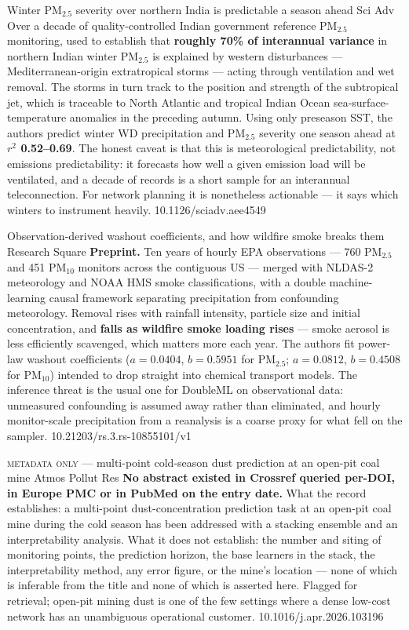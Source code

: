 \documentclass[10pt]{article}
\begin{document}
{Winter PM$_{2.5}$ severity over northern India is predictable a season ahead}
{Sci Adv}
{Over a decade of quality-controlled Indian government reference PM$_{2.5}$ monitoring,
used to establish that \textbf{roughly 70\% of interannual variance} in northern Indian
winter PM$_{2.5}$ is explained by western disturbances --- Mediterranean-origin
extratropical storms --- acting through ventilation and wet removal. The storms in turn
track to the position and strength of the subtropical jet, which is traceable to North
Atlantic and tropical Indian Ocean sea-surface-temperature anomalies in the preceding
autumn. Using only preseason SST, the authors predict winter WD precipitation and PM$_{2.5}$
severity one season ahead at \textbf{$r^2$ 0.52--0.69}. The honest caveat is that this is
meteorological predictability, not emissions predictability: it forecasts how well a given
emission load will be ventilated, and a decade of records is a short sample for an
interannual teleconnection. For network planning it is nonetheless actionable --- it says
which winters to instrument heavily.}
{10.1126/sciadv.aee4549}

{Observation-derived washout coefficients, and how wildfire smoke breaks them}
{Research Square}
{\textbf{Preprint.} Ten years of hourly EPA observations --- 760 PM$_{2.5}$ and 451
PM$_{10}$ monitors across the contiguous US --- merged with NLDAS-2 meteorology and NOAA
HMS smoke classifications, with a double machine-learning causal framework separating
precipitation from confounding meteorology. Removal rises with rainfall intensity,
particle size and initial concentration, and \textbf{falls as wildfire smoke loading
rises} --- smoke aerosol is less efficiently scavenged, which matters more each year. The
authors fit power-law washout coefficients ($a=0.0404$, $b=0.5951$ for PM$_{2.5}$;
$a=0.0812$, $b=0.4508$ for PM$_{10}$) intended to drop straight into chemical transport
models. The inference threat is the usual one for DoubleML on observational data:
unmeasured confounding is assumed away rather than eliminated, and hourly monitor-scale
precipitation from a reanalysis is a coarse proxy for what fell on the sampler.}
{10.21203/rs.3.rs-10855101/v1}

{\textsc{metadata only} --- multi-point cold-season dust prediction at an open-pit coal mine}
{Atmos Pollut Res}
{\textbf{No abstract existed in Crossref queried per-DOI, in Europe PMC or in PubMed on the
entry date.} What the record establishes: a multi-point dust-concentration prediction task
at an open-pit coal mine during the cold season has been addressed with a stacking ensemble
and an interpretability analysis. What it does not establish: the number and siting of
monitoring points, the prediction horizon, the base learners in the stack, the
interpretability method, any error figure, or the mine's location --- none of which is
inferable from the title and none of which is asserted here. Flagged for retrieval; open-pit
mining dust is one of the few settings where a dense low-cost network has an unambiguous
operational customer.}
{10.1016/j.apr.2026.103196}
\end{document}
